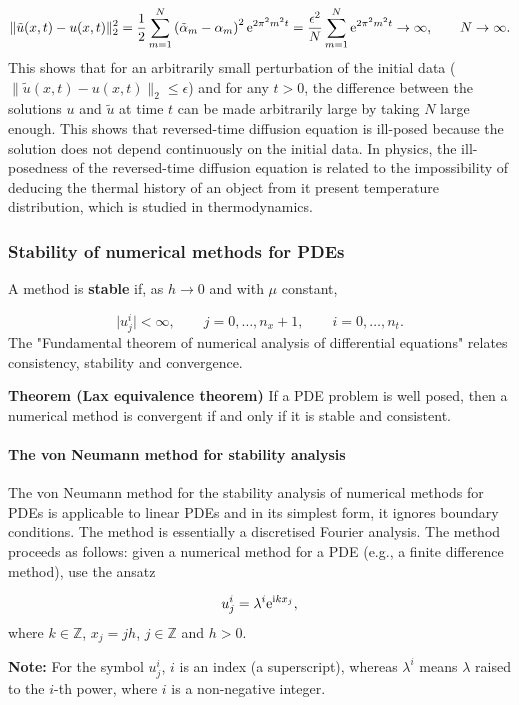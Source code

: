 \documentclass[12pt,landscape]{article}
\begin{document}
{\[
\|\tilde{u}(x,t) - u(x,t)\|_2^2 =  \frac{1}{2}\sum_{m=1}^{N} \left(\tilde{\alpha}_m - \alpha_m\right)^2 {\rm e}^{2\pi^2 m^2 t} = \frac{\epsilon^2}{N}\sum_{m=1}^{N} {\rm e}^{2\pi^2 m^2 t} \to \infty, \qquad N\to \infty.
\]
This shows that for an arbitrarily small perturbation of the initial data ($\|\tilde{u}(x,t) - u(x,t)\|_2 \leq \epsilon$) and for any $t > 0$, the difference between the solutions $u$ and $\tilde{u}$ at time $t$ can be made arbitrarily large by taking $N$ large enough. This shows that reversed-time diffusion equation is ill-posed because the solution does not depend continuously on the initial data.  In physics, the ill-posedness of the reversed-time diffusion equation is related to the impossibility of deducing the thermal history of an object from it present temperature distribution, which is studied in thermodynamics.

\subsubsection{Stability of numerical methods for PDEs}
A method is \textbf{stable} if, as $h \to 0$ and with $\mu$ constant,

\[
\vert u^i_j \vert < \infty, \qquad    j = 0, \ldots, n_x+1, \qquad i = 0, \ldots, n_t.
\]
The "Fundamental theorem of numerical analysis of differential equations" relates consistency, stability and convergence.

\textbf{Theorem (Lax equivalence theorem)} If a PDE problem is well posed, then a numerical method is convergent if and only if it is stable and consistent.

\paragraph{The von Neumann method for stability analysis}
The von Neumann method for the stability analysis of numerical methods for PDEs is applicable to linear PDEs and in its simplest form, it ignores boundary conditions. The method is essentially a discretised Fourier analysis.  The method proceeds as follows: given a numerical method for a PDE (e.g., a finite difference method), use the ansatz

\[
u^i_j = \lambda^i {\rm e}^{{\rm i}k x_j},
\]
where $k \in \mathbb{Z}$, $x_j = j h$, $j \in \mathbb{Z}$ and $h > 0$. 

\textbf{Note:} For the symbol $u^i_j$, $i$ is an index (a superscript), whereas $\lambda^i$ means $\lambda$ raised to the $i$-th power, where $i$ is a non-negative integer.  

}
\end{document}
